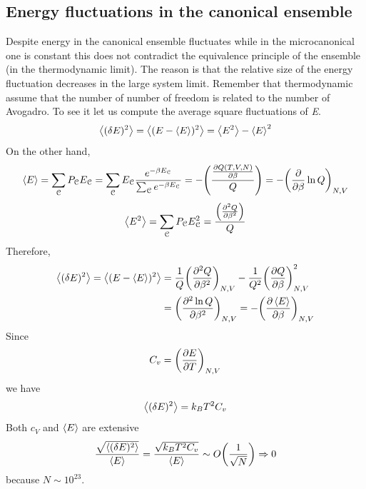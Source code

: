 \documentclass[../main/main.tex]{subfiles}
\begin{document}
\subsection{Energy fluctuations in the canonical ensemble}
Despite energy in the canonical ensemble fluctuates while in the microcanonical one is constant this does not contradict the equivalence principle of the ensemble (in the thermodynamic limit). The reason is that the relative size of the energy fluctuation decreases in the large system limit. Remember that thermodynamic assume that the number of number of freedom is related to the number of Avogadro.
To see it let us compute the average square fluctuations of \emph{E}.
\begin{equation}
\expval{(\delta E)^2} = \expval{(E- \expval{E} )^2} = \expval{E^2} - \expval{E}^2
\end{equation}
On the other hand,
\begin{equation}
  \expval{E} = \sum_{\mathcal{C}}^{} P_{\mathcal{C}} E_{\mathcal{C}} = \sum_{\mathcal{C}}^{} E_{\mathcal{C}} \frac{e^{-\beta E_{\mathcal{C}}} }{\sum_{\mathcal{C}}^{} e^{-\beta E_{\mathcal{C}}}  }
   = - \qty( \frac{\pdv{Q (T,V,N)}{\beta }}{Q} ) = - \qty(\pdv{}{\beta } \ln{Q})_{N,V}
\end{equation}
\begin{equation}
  \expval{E^2} = \sum_{\mathcal{C}}^{} P_{\mathcal{C}} E_{\mathcal{C}}^2 = \frac{\qty(\pdv[2]{Q}{\beta } )}{Q}
\end{equation}
Therefore,
\begin{equation}
\begin{split}
  \expval{(\delta E)^2} = \expval{(E- \expval{E} )^2}  &= \frac{1}{Q} \qty(\pdv[2]{Q}{\beta } )_{N,V} - \frac{1}{Q^2} \qty(\pdv{Q}{\beta } )^2_{N,V}\\
  & =  \qty( \pdv[2]{\ln{Q} }{\beta} )_{N,V} = - \qty(\pdv{\expval{E} }{\beta } )_{N,V}
\end{split}
\end{equation}
Since
\begin{equation}
  C_v = \qty(\pdv{E}{T} )_{N,V}
\end{equation}
we have
\begin{equation}
  \expval{(\delta E)^2} = k_B T^2 C_v
\end{equation}
Both \( c_V \) and \( \expval{E}  \) are extensive
\begin{equation}
  \frac{\sqrt{\expval{(\delta E)^2} } }{\expval{E} } = \frac{\sqrt{k_B T^2 C_v} }{\expval{E} } \sim O \qty(\frac{1}{\sqrt{N} }) \Rightarrow 0
\end{equation}
because \( N \sim 10^{23} \).
\end{document}

